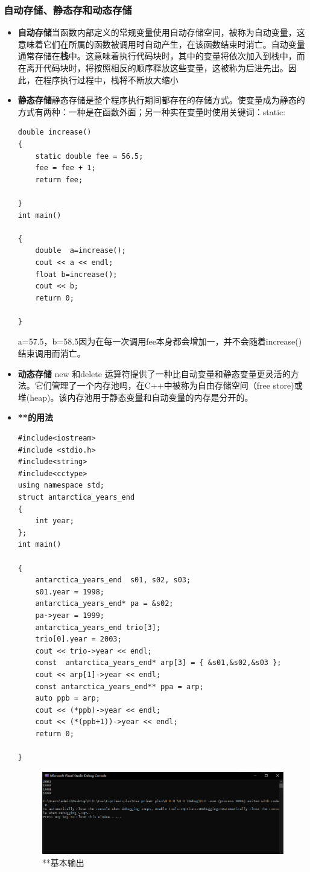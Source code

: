 \documentclass[a4paper,12pt]{article}
\begin{document}
\begin{spacing}{2}
\subsubsection{自动存储、静态存和动态存储}
\begin{itemize}
\item\textbf{自动存储}当函数内部定义的常规变量使用自动存储空间，被称为自动变量，这意味着它们在所属的函数被调用时自动产生，在该函数结束时消亡。自动变量通常存储在\textbf{栈}中。这意味着执行代码块时，其中的变量将依次加入到栈中，而在离开代码块时，将按照相反的顺序释放这些变量，这被称为后进先出。因此，在程序执行过程中，栈将不断放大缩小
\item\textbf{静态存储}静态存储是整个程序执行期间都存在的存储方式。使变量成为静态的方式有两种：一种是在函数外面；另一种实在变量时使用关键词：static:
\begin{lstlisting}
double increase()
{
	static double fee = 56.5;
	fee = fee + 1;
	return fee;
		
}
int main()

{
	double  a=increase();
	cout << a << endl;
	float b=increase();
	cout << b;
	return 0;

}
\end{lstlisting}a=57.5，b=58.5因为在每一次调用fee本身都会增加一，并不会随着increase()结束调用而消亡。
\item \textbf{动态存储} new 和delete 运算符提供了一种比自动变量和静态变量更灵活的方法。它们管理了一个内存池吗，在C++中被称为自由存储空间（free store)或 堆(heap)。该内存池用于静态变量和自动变量的内存是分开的。
\item \textbf{**的用法}
\begin{lstlisting}
#include<iostream>
#include <stdio.h>
#include<string>
#include<cctype>
using namespace std;
struct antarctica_years_end
{
	int year;
};
int main()

{
	antarctica_years_end  s01, s02, s03;
	s01.year = 1998;
	antarctica_years_end* pa = &s02;
	pa->year = 1999;
	antarctica_years_end trio[3];
	trio[0].year = 2003;
	cout << trio->year << endl;
	const  antarctica_years_end* arp[3] = { &s01,&s02,&s03 };
	cout << arp[1]->year << endl;
	const antarctica_years_end** ppa = arp;
	auto ppb = arp;
	cout << (*ppb)->year << endl;
	cout << (*(ppb+1))->year << endl;
	return 0;

}
\end{lstlisting}
\begin{figure}[h]
\includegraphics[scale=1]{Figure 1.PNG}
\caption{**基本输出}
\label{figure 1}
\end{figure}
\end{itemize}
\end{spacing}
\end{document}
